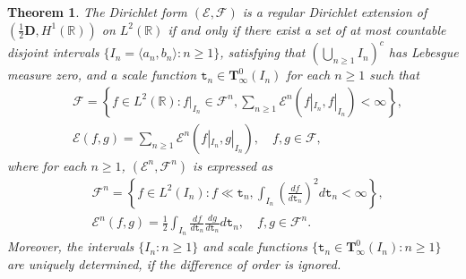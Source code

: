 \documentclass[a4paper]{amsart}
\newtheorem{theorem}{Theorem}[section]
\theoremstyle{definition}
\theoremstyle{remark}
\numberwithin{equation}{section}
\begin{document}
\begin{theorem}\label{THM23}
The Dirichlet form $({{\mathcal{E}}},{{\mathcal{F}}})$ is a regular Dirichlet extension of $(\frac{1}{2}\mathbf{D},H^1(\mathbb{R}))$ on $L^2(\mathbb{R})$ if and only if
there exist a set of at most countable disjoint intervals $\{I_n=\langle a_n, b_n\rangle: n\geq 1\}$,
satisfying that $ \left(\bigcup_{n\geq 1} I_n\right)^c$ 
has Lebesgue measure zero, and a scale function ${{\mathtt{t}}}_n\in {{\mathbf{T}}}^0_\infty(I_n)$ for each $ n\geq 1$ such that
\begin{equation}\label{EQ2FFL}
\begin{aligned}
&{{\mathcal{F}}}=\left\{f\in L^2(\mathbb{R}): f|_{I_n}\in {{\mathcal{F}}}^n, \sum_{n\geq 1}{{\mathcal{E}}}^n(f|_{I_n}, f|_{I_n})<\infty\right\},  \\
&{{\mathcal{E}}}(f,g)=\sum_{n\geq 1}{{\mathcal{E}}}^n(f|_{I_n}, g|_{I_n}),\quad f,g\in {{\mathcal{F}}},
\end{aligned}\end{equation}
where for each $n\geq 1$, $({{\mathcal{E}}}^n,{{\mathcal{F}}}^n)$ is expressed as
\begin{equation}\label{EQ2FNU}
\begin{aligned}
&{{\mathcal{F}}}^n=\left\{f\in L^2(I_n): f\ll {{\mathtt{t}}}_n, \int_{I_n}\left(\frac{df}{d{{\mathtt{t}}}_n}\right)^2d{{\mathtt{t}}}_n<\infty \right\}, \\
&{{\mathcal{E}}}^n(f,g)=\frac{1}{2}\int_{I_n}\frac{df}{d{{\mathtt{t}}}_n}\frac{dg}{d{{\mathtt{t}}}_n}d{{\mathtt{t}}}_n,\quad f,g\in {{\mathcal{F}}}^n.
\end{aligned}
\end{equation}
Moreover, the intervals $\{I_n: n\geq 1\}$ and scale functions $\{{{\mathtt{t}}}_n\in \mathbf{T}^0_\infty(I_n):n\geq 1\}$
are uniquely determined, if the difference of order is ignored.
\end{theorem}
\end{document}

